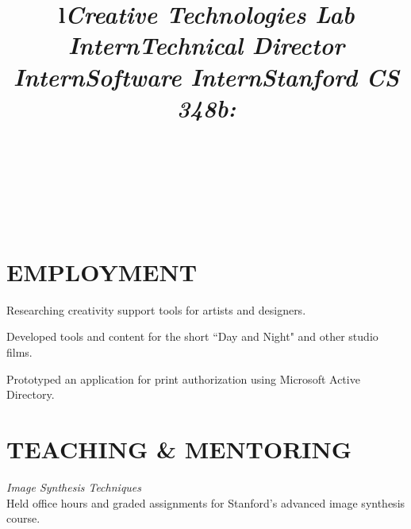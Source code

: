 \documentclass[line,margin]{res}
\begin{document}
\begin{resume}


\begin{format}
\\
\title{l}\\
\body\\
\end{format}


\section{EMPLOYMENT}

\title{\emph{Creative Technologies Lab Intern}}
\begin{position}
Researching creativity support tools for artists and designers.
\end{position}

\title{\emph{Technical Director Intern}}
\begin{position}
Developed tools and content for the short ``Day and Night" and other studio films.
\end{position}

\title{\emph{Software Intern}}
\begin{position}
Prototyped an application for print authorization using Microsoft Active Directory.
\end{position}


\section{TEACHING \& MENTORING}


\title{\emph{Stanford CS 348b:}}
\begin{position}
\emph{Image Synthesis Techniques}\\
Held office hours and graded assignments for Stanford's advanced image synthesis course.
\end{position}


\end{resume}
\end{document}
